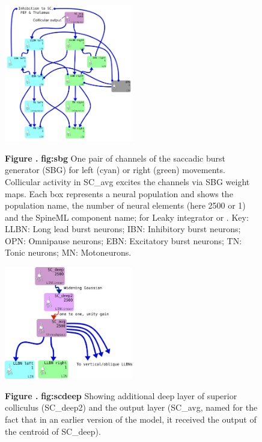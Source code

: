 \documentclass{frontiersSCNS}
\begin{document}
\begin{figure}[htb!]
\begin{center}
\includegraphics[width=0.5\textwidth]{./figures/Brain_Stem_1channel.png}
\end{center}
\textbf{\label{fig:sbg} Figure .}
{ \textbf{fig:sbg} One pair of channels of the saccadic burst
generator (SBG) for left (cyan) or right (green) movements. Collicular
activity in SC\_avg excites the channels via SBG weight maps. Each box
represents a neural population and shows the population name, the
number of neural elements (here 2500 or 1) and the SpineML component
name;  for Leaky integrator or . Key: LLBN:
Long lead burst neurons; IBN: Inhibitory burst neurons; OPN: Omnipause
neurons; EBN: Excitatory burst neurons; TN: Tonic neurons; MN:
Motoneurons.}
\end{figure}

\begin{figure}[htb!]
\begin{center}
\includegraphics[width=0.5\textwidth]{./figures/SC_to_brainstem.png}
\end{center}
\textbf{\label{fig:scdeep} Figure .}
{ \textbf{fig:scdeep} Showing additional deep layer of superior colliculus
(SC\_deep2) and the output layer (SC\_avg, named for the fact that in an earlier
version of the model, it received the output of the centroid of SC\_deep).}
\end{figure}
\end{document}
